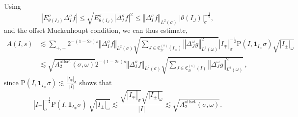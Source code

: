 \documentclass{amsart}%
\theoremstyle{plain}
\numberwithin{equation}{section}
\begin{document}
Using
\begin{equation}
\left\vert E_{\theta\left(  I_{J}\right)  }^{\sigma}\Delta_{I}^{\sigma
}f\right\vert \leq\sqrt{E_{\theta\left(  I_{J}\right)  }^{\sigma}\left\vert
\Delta_{I}^{\sigma}f\right\vert ^{2}}\leq\left\Vert \Delta_{I}^{\sigma
}f\right\Vert _{L^{2}\left(  \sigma\right)  }\ \left\vert \theta\left(
I_{J}\right)  \right\vert _{\sigma}^{-\frac{1}{2}},\label{e.haarAvg}%
\end{equation}
and the offset Muckenhoupt condition, we can thus estimate,
\begin{align*}
A(I,s)  & \lesssim\sum_{+,-}2^{-\left(  1-2\varepsilon\right)  s}\left\Vert
\Delta_{I}^{\sigma}f\right\Vert _{L^{2}\left(  \sigma\right)  }\sqrt
{\sum_{J\in\mathfrak{C}_{\mathcal{D}}^{\left(  s\right)  }\left(  I_{\pm
}\right)  }\left\Vert \Delta_{J}^{\omega}g\right\Vert _{L^{2}\left(
\omega\right)  }^{2}}\left\vert I_{\mp}\right\vert _{\sigma}^{-\frac{1}{2}%
}\mathrm{P}(I,\mathbf{1}_{I_{\mp}}\sigma)\sqrt{\left\vert I_{\pm}\right\vert
_{\omega}}\\
& \lesssim\sqrt{A_{2}^{\operatorname*{offset}}\left(  \sigma,\omega\right)
}2^{-\left(  1-2\varepsilon\right)  s}\left\Vert \Delta_{I}^{\sigma
}f\right\Vert _{L^{2}\left(  \sigma\right)  }\sqrt{\sum_{J\in\mathfrak{C}%
_{\mathcal{D}}^{\left(  s\right)  }\left(  I\right)  }\left\Vert \Delta
_{J}^{\omega}g\right\Vert _{L^{2}\left(  \omega\right)  }^{2}}\,,
\end{align*}
since $\mathrm{P}(I,\mathbf{1}_{I_{\mp}}\sigma)\lesssim\frac{\left\vert
I_{\mp}\right\vert _{\sigma}}{\left\vert I\right\vert }$ shows that
\[
\left\vert I_{\mp}\right\vert _{\sigma}^{-\frac{1}{2}}\mathrm{P}%
(I,\mathbf{1}_{I_{\mp}}\sigma)\ \sqrt{\left\vert I_{\pm}\right\vert _{\omega}%
}\lesssim\frac{\sqrt{\left\vert I_{\mp}\right\vert _{\sigma}}\sqrt{\left\vert
I_{\pm}\right\vert _{\omega}}}{\left\vert I\right\vert }\lesssim\sqrt
{A_{2}^{\operatorname*{offset}}\left(  \sigma,\omega\right)  }.
\]
\end{document}
